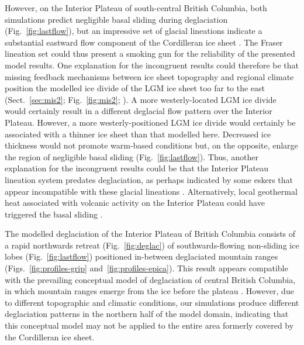 \documentclass[tc]{copernicus}
\begin{document}
However, on the Interior Plateau of south-central British Columbia, both
simulations predict negligible basal sliding during deglaciation
(Fig.~\ref{fig:lastflow}), but an impressive set of glacial lineations
indicate a substantial eastward flow component of the Cordilleran ice sheet
\citep{Prest.etal.1968, Kleman.etal.2010}.
The Fraser lineation set could thus present a smoking gun for the
reliability of the presented model results. One explanation for the incongruent
results could therefore be that missing feedback mechanisms between ice sheet
topography and regional climate position the modelled ice divide of the LGM ice
sheet too far to the east (Sect.~\ref{sec:mis2}; Fig.~\ref{fig:mis2};
\citealp{Seguinot.etal.2014}). A more westerly-located LGM ice divide would
certainly result in a different deglacial flow pattern over the Interior
Plateau. However, a more westerly-positioned LGM ice divide would certainly be
associated with a thinner ice sheet than that modelled here. Decreased ice
thickness would not promote warm-based conditions but, on the
opposite, enlarge the region of negligible basal sliding
(Fig.~\ref{fig:lastflow}). Thus, another explanation for the incongruent
results could be that the Interior Plateau lineation system predates
deglaciation, as perhaps indicated by some eskers that appear incompatible with
these glacial lineations \citep[Fig.~9]{Margold.etal.2013a}. Alternatively,
local geothermal heat associated with volcanic activity on the Interior Plateau
could have triggered the basal sliding
\citep[cf. Greenland ice sheet,][]{Fahnestock.etal.2001}.

The modelled deglaciation of the Interior Plateau of British Columbia
consists of a rapid northwards retreat (Fig.~\ref{fig:deglac}) of
southwards-flowing non-sliding ice lobes (Fig.~\ref{fig:lastflow}) positioned
in-between deglaciated mountain ranges
(Figs.~\ref{fig:profiles-grip} and~\ref{fig:profiles-epica}). This result
appears compatible with the prevailing conceptual model of deglaciation of
central British Columbia, in which mountain ranges emerge from the ice before
the plateau \citep[Fig.~7]{Fulton.1991}. However, due to different topographic
and climatic conditions, our simulations produce different deglaciation
patterns in the northern half of the model domain, indicating that this
conceptual model may not be applied to the entire area formerly covered by the
Cordilleran ice sheet.


\conclusions
\label{sec:concl}
\end{document}
